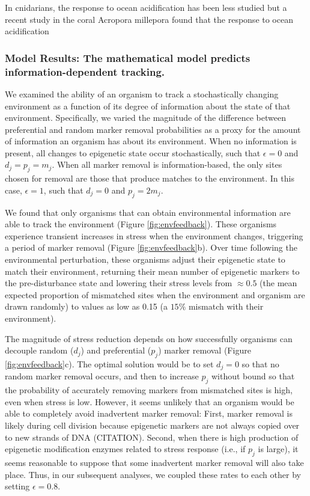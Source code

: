 \documentclass{article}
\begin{document}
In cnidarians, the response to ocean acidification has been less studied but a recent study in the coral Acropora millepora found that the response to ocean acidification



\subsubsection{Model Results: The mathematical model predicts information-dependent tracking.}
We examined the ability of an organism to track a stochastically changing environment as a function of its degree of information about the state of that environment. Specifically, we varied the magnitude of the difference between preferential and random marker removal probabilities as a proxy for the amount of information an organism has about its environment. When no information is present, all changes to epigenetic state occur stochastically, such that $\epsilon = 0$ and $d_j = p_j = m_j$. When all marker removal is information-based, the only sites chosen for removal are those that produce matches to the environment. In this case, $\epsilon = 1$, such that $d_j = 0$ and $p_j = 2m_j$. 

We found that %
only organisms that can obtain environmental information are able to track the environment (Figure \ref{fig:envfeedback}). These organisms experience transient increases in stress when the environment changes, triggering a period of marker removal (Figure \ref{fig:envfeedback}b). Over time following the environmental perturbation, these organisms adjust their epigenetic state to match their environment, returning their mean number of epigenetic markers to the pre-disturbance state and lowering their stress levels from $\approx 0.5$ (the mean expected proportion of mismatched sites when the environment and organism are drawn randomly) to values as low as 0.15 (a $15\%$ mismatch with their environment). 

The magnitude of stress reduction depends on how successfully organisms can decouple random ($d_j$) and preferential ($p_j$) marker removal (Figure \ref{fig:envfeedback}c). The optimal solution would be to set $d_j = 0$ so that no random marker removal occurs, and then to increase $p_j$ without bound so that the probability of accurately removing markers from mismatched sites is high, even when stress is low. However, it seems unlikely that an organism would be able to completely avoid inadvertent marker removal: First, marker removal is likely during cell division because epigenetic markers are not always copied over to new strands of DNA (CITATION). Second, when there is high production of epigenetic modification enzymes related to stress response (i.e., if $p_j$ is large), it seems reasonable to suppose that some inadvertent marker removal will also take place. Thus, in our subsequent analyses, we coupled these rates to each other by setting $\epsilon = 0.8$. %
\end{document}
